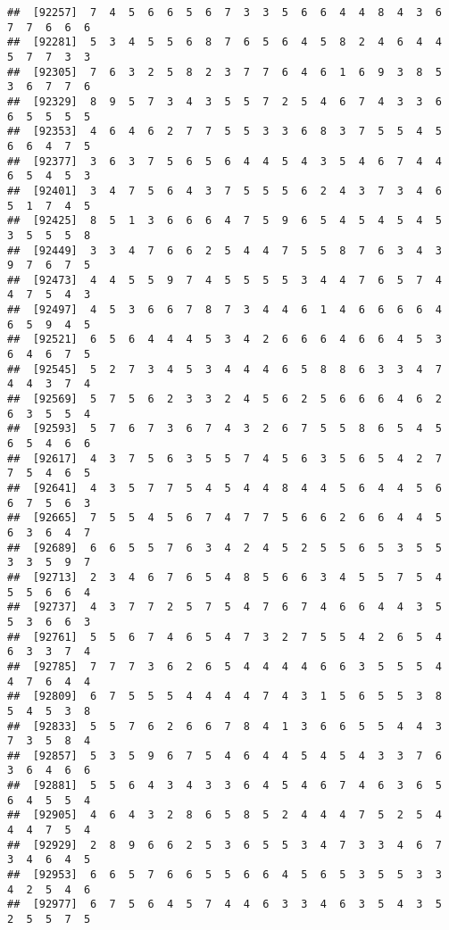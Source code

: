 \documentclass[
]{book}
\begin{document}
\begin{verbatim}
##  [92257]  7  4  5  6  6  5  6  7  3  3  5  6  6  4  4  8  4  3  6  7  7  6  6  6
##  [92281]  5  3  4  5  5  6  8  7  6  5  6  4  5  8  2  4  6  4  4  5  7  7  3  3
##  [92305]  7  6  3  2  5  8  2  3  7  7  6  4  6  1  6  9  3  8  5  3  6  7  7  6
##  [92329]  8  9  5  7  3  4  3  5  5  7  2  5  4  6  7  4  3  3  6  6  5  5  5  5
##  [92353]  4  6  4  6  2  7  7  5  5  3  3  6  8  3  7  5  5  4  5  6  6  4  7  5
##  [92377]  3  6  3  7  5  6  5  6  4  4  5  4  3  5  4  6  7  4  4  6  5  4  5  3
##  [92401]  3  4  7  5  6  4  3  7  5  5  5  6  2  4  3  7  3  4  6  5  1  7  4  5
##  [92425]  8  5  1  3  6  6  6  4  7  5  9  6  5  4  5  4  5  4  5  3  5  5  5  8
##  [92449]  3  3  4  7  6  6  2  5  4  4  7  5  5  8  7  6  3  4  3  9  7  6  7  5
##  [92473]  4  4  5  5  9  7  4  5  5  5  5  3  4  4  7  6  5  7  4  4  7  5  4  3
##  [92497]  4  5  3  6  6  7  8  7  3  4  4  6  1  4  6  6  6  6  4  6  5  9  4  5
##  [92521]  6  5  6  4  4  4  5  3  4  2  6  6  6  4  6  6  4  5  3  6  4  6  7  5
##  [92545]  5  2  7  3  4  5  3  4  4  4  6  5  8  8  6  3  3  4  7  4  4  3  7  4
##  [92569]  5  7  5  6  2  3  3  2  4  5  6  2  5  6  6  6  4  6  2  6  3  5  5  4
##  [92593]  5  7  6  7  3  6  7  4  3  2  6  7  5  5  8  6  5  4  5  6  5  4  6  6
##  [92617]  4  3  7  5  6  3  5  5  7  4  5  6  3  5  6  5  4  2  7  7  5  4  6  5
##  [92641]  4  3  5  7  7  5  4  5  4  4  8  4  4  5  6  4  4  5  6  6  7  5  6  3
##  [92665]  7  5  5  4  5  6  7  4  7  7  5  6  6  2  6  6  4  4  5  6  3  6  4  7
##  [92689]  6  6  5  5  7  6  3  4  2  4  5  2  5  5  6  5  3  5  5  3  3  5  9  7
##  [92713]  2  3  4  6  7  6  5  4  8  5  6  6  3  4  5  5  7  5  4  5  5  6  6  4
##  [92737]  4  3  7  7  2  5  7  5  4  7  6  7  4  6  6  4  4  3  5  5  3  6  6  3
##  [92761]  5  5  6  7  4  6  5  4  7  3  2  7  5  5  4  2  6  5  4  6  3  3  7  4
##  [92785]  7  7  7  3  6  2  6  5  4  4  4  4  6  6  3  5  5  5  4  4  7  6  4  4
##  [92809]  6  7  5  5  5  4  4  4  4  7  4  3  1  5  6  5  5  3  8  5  4  5  3  8
##  [92833]  5  5  7  6  2  6  6  7  8  4  1  3  6  6  5  5  4  4  3  7  3  5  8  4
##  [92857]  5  3  5  9  6  7  5  4  6  4  4  5  4  5  4  3  3  7  6  3  6  4  6  6
##  [92881]  5  5  6  4  3  4  3  3  6  4  5  4  6  7  4  6  3  6  5  6  4  5  5  4
##  [92905]  4  6  4  3  2  8  6  5  8  5  2  4  4  4  7  5  2  5  4  4  4  7  5  4
##  [92929]  2  8  9  6  6  2  5  3  6  5  5  3  4  7  3  3  4  6  7  3  4  6  4  5
##  [92953]  6  6  5  7  6  6  5  5  6  6  4  5  6  5  3  5  5  3  3  4  2  5  4  6
##  [92977]  6  7  5  6  4  5  7  4  4  6  3  3  4  6  3  5  4  3  5  2  5  5  7  5

\end{verbatim}
\end{document}
